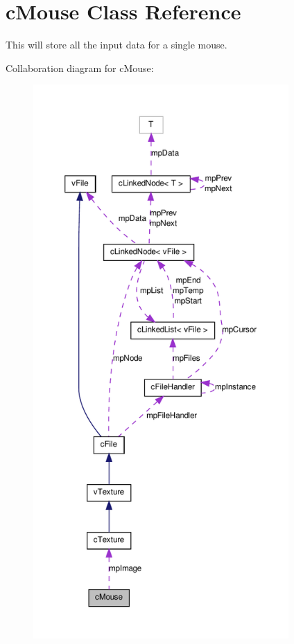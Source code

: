 \hypertarget{classc_mouse}{
\section{cMouse Class Reference}
\label{classc_mouse}
}


This will store all the input data for a single mouse.  




Collaboration diagram for cMouse:
\nopagebreak
\begin{figure}[H]
\begin{center}
\leavevmode
\includegraphics[height=600pt]{classc_mouse__coll__graph}
\end{center}
\end{figure}
